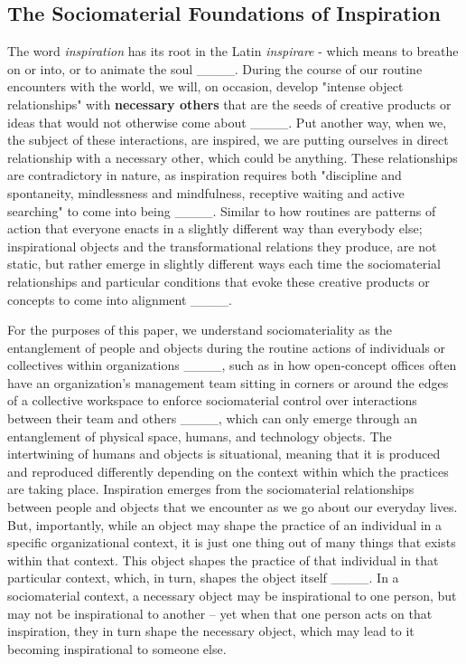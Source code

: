 \subsection{The Sociomaterial Foundations of Inspiration}
    The word \textit{inspiration} has its root in the Latin \textit{inspirare} - which means to breathe on or into, or to animate the soul ____. During the course of our routine encounters with the world, we will, on occasion, develop "intense object relationships" with \textbf{necessary others} that are the seeds of creative products or ideas that would not otherwise come about ____. Put another way, when we, the subject of these interactions, are inspired, we are putting ourselves in direct relationship with a necessary other, which could be anything. These relationships are contradictory in nature, as inspiration requires both "discipline and spontaneity, mindlessness and mindfulness, receptive waiting and active searching" to come into being ____. Similar to how routines are patterns of action that everyone enacts in a slightly different way than everybody else; inspirational objects and the transformational relations they produce, are not static, but rather emerge in slightly different ways each time the sociomaterial relationships and particular conditions that evoke these creative products or concepts to come into alignment ____.\par

    For the purposes of this paper, we understand sociomateriality as the entanglement of people and objects during the routine actions of individuals or collectives within organizations ____, such as in how open-concept offices often have an organization's management team sitting in corners or around the edges of a collective workspace to enforce sociomaterial control over interactions between their team and others ____, which can only emerge through an entanglement of physical space, humans, and technology objects. The intertwining of humans and objects is situational, meaning that it is produced and reproduced differently depending on the context within which the practices are taking place. Inspiration emerges from the sociomaterial relationships between people and objects that we encounter as we go about our everyday lives. But, importantly, while an object may shape the practice of an individual in a specific organizational context, it is just one thing out of many things that exists within that context. This object shapes the practice of that individual in that particular context, which, in turn, shapes the object itself ____. In a sociomaterial context, a necessary object may be inspirational to one person, but may not be inspirational to another -- yet when that one person acts on that inspiration, they in turn shape the necessary object, which may lead to it becoming inspirational to someone else. \par

